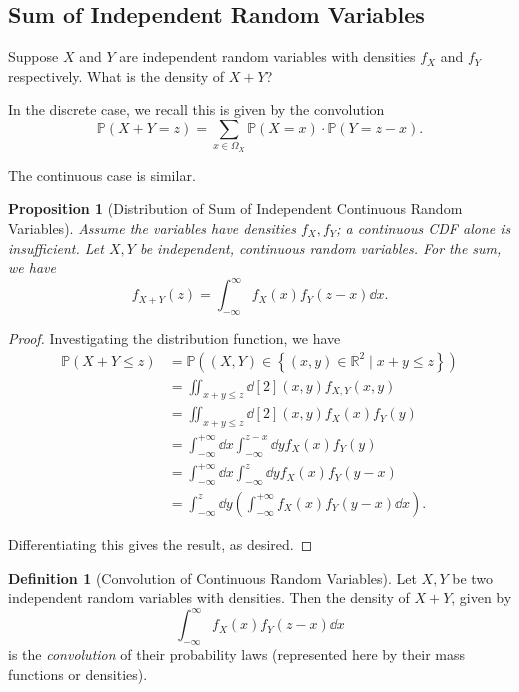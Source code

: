 \documentclass[11pt]{article}
\numberwithin{equation}{section}
\newtheorem{proposition}[theorem]{Proposition}
\theoremstyle{definition}
\newtheorem{definition}[theorem]{Definition}
\theoremstyle{remark}
\newcommand{\pqty}[1]{\left(#1\right)}
\newcommand{\set}[2]{\left\{#1\mid #2\right\}}
\newcommand{\RR}{\mathbb R}
\newcommand{\plusinfty}{+\infty}
\newcommand{\minusinfty}{-\infty}
\newcommand{\Prob}{\mathbb P}
\begin{document}
\subsection{Sum of Independent Random Variables}

Suppose \(X\) and \(Y\) are independent random variables with densities \(f_X\) and \(f_Y\) respectively. What is the density of \(X + Y\)?

In the discrete case, we recall this is given by the convolution
\[
    \Prob\pqty{X + Y = z} = \sum_{x\in\Omega_X} \Prob\pqty{X = x} \cdot \Prob\pqty{Y = z - x}.
\]

The continuous case is similar.

\begin{proposition}[Distribution of Sum of Independent Continuous Random Variables]\label{probability-proposition-038}
    \label{probability-prop:dist-sum-indp-crv}
Assume the variables have densities \(f_X,f_Y\); a continuous CDF alone is insufficient.
%
    Let \(X, Y\) be independent, continuous random variables. For the sum, we have
    \[
        f_{X + Y}\pqty{z} = \int_{\minusinfty}^{\infty} f_X\pqty{x} f_Y\pqty{z - x} \dd{x}.
    \]
\end{proposition}

\begin{proof}\label{probability-proof-070}
    Investigating the distribution function, we have
    \begin{align*}
        \Prob\pqty{X + Y \leq z} &= \Prob\pqty{\pqty{X, Y} \in \set{\pqty{x, y} \in \RR^2}{x + y \leq z}} \\
        &= \iint_{x + y \leq z} \dd[2]{\pqty{x, y}} f_{X, Y} \pqty{x, y} \\
        &= \iint_{x + y \leq z} \dd[2]{\pqty{x, y}} f_{X} \pqty{x} f_{Y} \pqty{y} \\
        &= \int_{\minusinfty}^{\plusinfty} \dd{x} \int_{\minusinfty}^{z - x} \dd{y} f_X\pqty{x} f_Y\pqty{y} \\
        &= \int_{\minusinfty}^{\plusinfty} \dd{x} \int_{\minusinfty}^{z} \dd{y} f_X\pqty{x} f_Y\pqty{y - x} \\
        &= \int_{\minusinfty}^{z} \dd{y} \pqty{\int_{\minusinfty}^{\plusinfty} f_X\pqty{x} f_Y\pqty{y - x} \dd{x}}.
    \end{align*}

    Differentiating this gives the result, as desired.
\end{proof}

\begin{definition}[Convolution of Continuous Random Variables]\label{probability-definition-054}
    \label{probability-def:convolution-crv}%
    Let \(X, Y\) be two independent random variables with densities. Then the density of \(X + Y\), given by
    \[
        \int_{\minusinfty}^{\infty} f_X\pqty{x} f_Y\pqty{z - x} \dd{x}
    \]
    is the \emph{convolution} of their probability laws (represented here by their mass functions or densities).
\end{definition}
\end{document}
